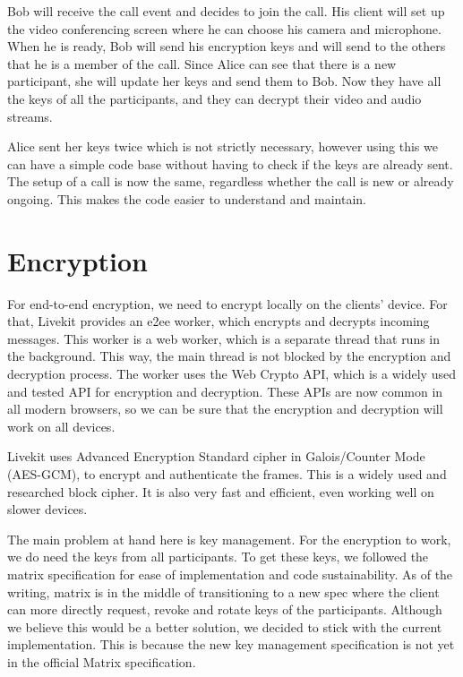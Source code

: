 \documentclass{report}
\begin{document}
Bob will receive the call event and decides to join the call. His client will set up the video conferencing
screen where he can choose his camera and microphone. When he is ready, Bob will send his encryption keys and will
send to the others that he is a member of the call. Since Alice can see that there is a new participant, she will
update her keys and send them to Bob. Now they have all the keys of all the participants, and they can decrypt their
video and audio streams.

Alice sent her keys twice which is not strictly necessary, however using this we can have a simple code base
without having to check if the keys are already sent. The setup of a call is now the same, regardless whether
the call is new or already ongoing. This makes the code easier to understand and maintain.

\section{Encryption}
For end-to-end encryption, we need to encrypt locally on the clients' device. For that, Livekit provides an e2ee worker,
which encrypts and decrypts incoming messages. This worker is a web worker, which is a separate
thread that runs in the background. This way, the main thread is not blocked by the encryption and decryption
process. The worker uses the Web Crypto API, which is a widely used and tested API for encryption and decryption.
These APIs are now common in all modern browsers, so we can be sure that the encryption and decryption will work on
all devices.

Livekit uses Advanced Encryption Standard cipher in Galois/Counter Mode (AES-GCM)\cite{national_institute_of_standards_and_technology_us_advanced_2023}\cite{
mcgrew_galoiscounter_nodate}, to encrypt and authenticate the frames. This is a widely used and researched block
cipher. It is also very fast and efficient, even working well on slower devices.

The main problem at hand here is key management. For the encryption to work, we do need the keys from all
participants. To get these keys, we followed the matrix specification for ease of implementation and code
sustainability. As of the writing, matrix is in the middle of transitioning to a new spec where the client can more
directly request, revoke and rotate keys of the participants. Although we believe this would be a better solution, we
decided to stick with the current implementation. This is because the new key management specification is not yet in
the official Matrix specification.
\end{document}
